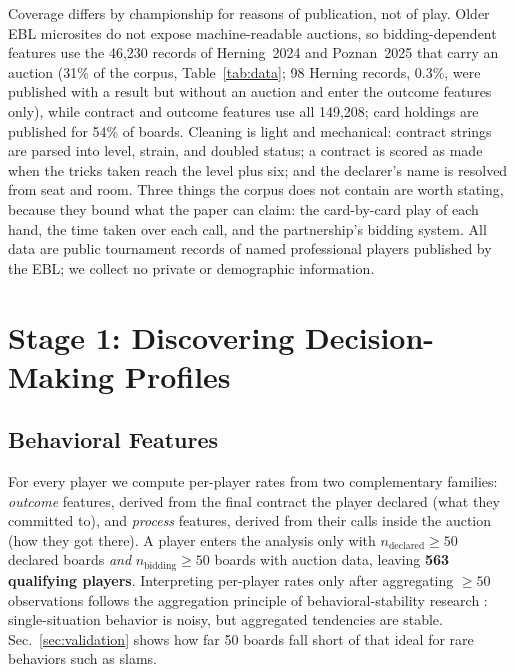 \documentclass[11pt,a4paper]{article}
\begin{document}
Coverage differs by championship for reasons of publication, not of
play. Older EBL microsites do not expose machine-readable auctions, so
bidding-dependent features use the 46{,}230 records of Herning~2024
and Poznan~2025 that carry an auction (31\% of the corpus,
Table~\ref{tab:data}; 98 Herning records, 0.3\%, were published with a
result but without an auction and enter the outcome features only),
while contract and outcome features use all 149{,}208; card holdings
are published for 54\% of boards. Cleaning is light and mechanical: contract strings
are parsed into level, strain, and doubled status; a contract is
scored as made when the tricks taken reach the level plus six; and the
declarer's name is resolved from seat and room. Three things the corpus
does not contain are worth stating, because they bound what the paper
can claim: the card-by-card play of each hand, the time taken over each
call, and the partnership's bidding system. All data are public
tournament records of named professional players published by the EBL;
we collect no private or demographic information.

\section{Stage 1: Discovering Decision-Making Profiles}\label{sec:stage1}

\subsection{Behavioral Features}\label{sec:features}

For every player we compute per-player rates from two complementary
families: \emph{outcome} features, derived from the final contract the
player declared (what they committed to), and \emph{process} features,
derived from their calls inside the auction (how they got there). A
player enters the analysis only with $n_{\mathrm{declared}}\ge 50$
declared boards \emph{and} $n_{\mathrm{bidding}}\ge 50$ boards with
auction data, leaving \textbf{563 qualifying players}. Interpreting
per-player rates only after aggregating $\ge 50$ observations follows
the aggregation principle of behavioral-stability research
\cite{epstein1979stability}: single-situation behavior is noisy, but
aggregated tendencies are stable. Sec.~\ref{sec:validation} shows how
far 50 boards fall short of that ideal for rare behaviors such as
slams.
\end{document}
